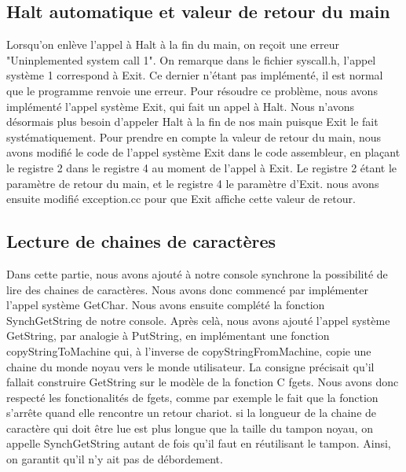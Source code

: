 \documentclass[12pt]{article}
\begin{document}
\bigbreak
\subsection{Halt automatique et valeur de retour du main}
Lorsqu'on enlève l'appel à \textcolor{blue2}{Halt} à la fin du main, on reçoit une erreur "Uninplemented system call 1". On remarque dans le fichier \textcolor{vert2}{syscall.h}, l'appel système 1 correspond à \textcolor{blue2}{Exit}. Ce dernier n'étant pas implémenté, il est normal que le programme renvoie une erreur. Pour résoudre ce problème, nous avons implémenté l'appel système \textcolor{blue2}{Exit}, qui fait un appel à \textcolor{blue2}{Halt}. Nous n'avons désormais plus besoin d'appeler \textcolor{blue2}{Halt} à la fin de nos main puisque \textcolor{blue2}{Exit} le fait systématiquement.
\newline
Pour prendre en compte la valeur de retour du main, nous avons modifié le code de l'appel système \textcolor{blue2}{Exit} dans le code assembleur, en plaçant le registre 2 dans le registre 4 au moment de l'appel à \textcolor{blue2}{Exit}. Le registre 2 étant le paramètre de retour du main, et le registre 4 le paramètre d'\textcolor{blue2}{Exit}. nous avons ensuite modifié exception.cc pour que \textcolor{blue2}{Exit} affiche cette valeur de retour.

\bigbreak
\subsection{Lecture de chaines de caractères}
Dans cette partie, nous avons ajouté à notre console synchrone la possibilité de lire des chaines de caractères. Nous avons donc commencé par implémenter l'appel système \textcolor{blue2}{GetChar}. Nous avons ensuite complété la fonction \textcolor{red2}{SynchGetString} de notre console. Après celà, nous avons ajouté l'appel système \textcolor{blue2}{GetString}, par analogie à \textcolor{blue2}{PutString}, en implémentant une fonction \textcolor{red2}{copyStringToMachine} qui, à l'inverse de \textcolor{red2}{copyStringFromMachine}, copie une chaine du monde noyau vers le monde utilisateur.
\newline
La consigne précisait qu'il fallait construire \textcolor{blue2}{GetString} sur le modèle de la fonction C \textcolor{red2}{fgets}. Nous avons donc respecté les fonctionalités de \textcolor{red2}{fgets}, comme par exemple le fait que la fonction s'arrête quand elle rencontre un retour chariot. si la longueur de la chaine de caractère qui doit être lue est plus longue que la taille du tampon noyau, on appelle \textcolor{red2}{SynchGetString} autant de fois qu'il faut en réutilisant le tampon. Ainsi, on garantit qu'il n'y ait pas de débordement.
\end{document}
